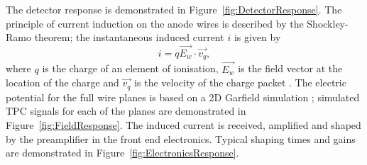 The detector response is demonstrated in Figure~\ref{fig:DetectorResponse}.  The principle of current induction on the anode wires is described by the Shockley-Ramo \cite{Shockley1938,Ramo1939} theorem; the instantaneous induced current $i$ is given by
\begin{equation}
  i = q \vec{E_w} \cdot \vec{v_q},
\end{equation}
where $q$ is the charge of an element of ionisation, $\vec{E_w}$ is the field vector at the location of the charge and $\vec{v_q}$ is the velocity of the charge packet \cite{MicroBooNERawCharge2016}.  The electric potential for the full wire planes is based on a 2D Garfield simulation \cite{GarfieldWebsite}; simulated TPC signals for each of the planes are demonstrated in Figure~\ref{fig:FieldResponse}.  The induced current is received, amplified and shaped by the preamplifier in the front end electronics.  Typical shaping times and gains are demonstrated in Figure~\ref{fig:ElectronicsResponse}.

